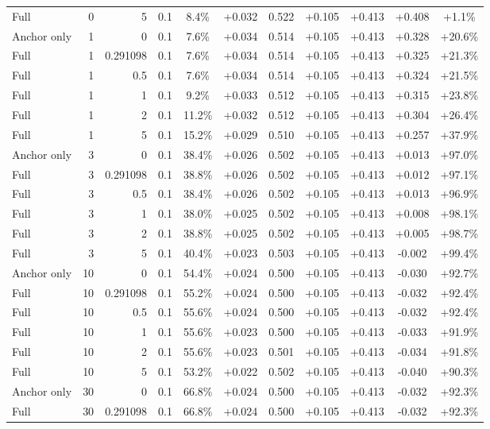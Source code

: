 \begin{table}[htbp]
\begin{tabular}{lrrrccccccc}
Full & 0 & 5 & 0.1 & 8.4\% & +0.032 & 0.522 & +0.105 & +0.413 & +0.408 & +1.1\% \\
Anchor only & 1 & 0 & 0.1 & 7.6\% & +0.034 & 0.514 & +0.105 & +0.413 & +0.328 & +20.6\% \\
Full & 1 & 0.291098 & 0.1 & 7.6\% & +0.034 & 0.514 & +0.105 & +0.413 & +0.325 & +21.3\% \\
Full & 1 & 0.5 & 0.1 & 7.6\% & +0.034 & 0.514 & +0.105 & +0.413 & +0.324 & +21.5\% \\
Full & 1 & 1 & 0.1 & 9.2\% & +0.033 & 0.512 & +0.105 & +0.413 & +0.315 & +23.8\% \\
Full & 1 & 2 & 0.1 & 11.2\% & +0.032 & 0.512 & +0.105 & +0.413 & +0.304 & +26.4\% \\
Full & 1 & 5 & 0.1 & 15.2\% & +0.029 & 0.510 & +0.105 & +0.413 & +0.257 & +37.9\% \\
Anchor only & 3 & 0 & 0.1 & 38.4\% & +0.026 & 0.502 & +0.105 & +0.413 & +0.013 & +97.0\% \\
Full & 3 & 0.291098 & 0.1 & 38.8\% & +0.026 & 0.502 & +0.105 & +0.413 & +0.012 & +97.1\% \\
Full & 3 & 0.5 & 0.1 & 38.4\% & +0.026 & 0.502 & +0.105 & +0.413 & +0.013 & +96.9\% \\
Full & 3 & 1 & 0.1 & 38.0\% & +0.025 & 0.502 & +0.105 & +0.413 & +0.008 & +98.1\% \\
Full & 3 & 2 & 0.1 & 38.8\% & +0.025 & 0.502 & +0.105 & +0.413 & +0.005 & +98.7\% \\
Full & 3 & 5 & 0.1 & 40.4\% & +0.023 & 0.503 & +0.105 & +0.413 & -0.002 & +99.4\% \\
Anchor only & 10 & 0 & 0.1 & 54.4\% & +0.024 & 0.500 & +0.105 & +0.413 & -0.030 & +92.7\% \\
Full & 10 & 0.291098 & 0.1 & 55.2\% & +0.024 & 0.500 & +0.105 & +0.413 & -0.032 & +92.4\% \\
Full & 10 & 0.5 & 0.1 & 55.6\% & +0.024 & 0.500 & +0.105 & +0.413 & -0.032 & +92.4\% \\
Full & 10 & 1 & 0.1 & 55.6\% & +0.023 & 0.500 & +0.105 & +0.413 & -0.033 & +91.9\% \\
Full & 10 & 2 & 0.1 & 55.6\% & +0.023 & 0.501 & +0.105 & +0.413 & -0.034 & +91.8\% \\
Full & 10 & 5 & 0.1 & 53.2\% & +0.022 & 0.502 & +0.105 & +0.413 & -0.040 & +90.3\% \\
Anchor only & 30 & 0 & 0.1 & 66.8\% & +0.024 & 0.500 & +0.105 & +0.413 & -0.032 & +92.3\% \\
Full & 30 & 0.291098 & 0.1 & 66.8\% & +0.024 & 0.500 & +0.105 & +0.413 & -0.032 & +92.3\% \\

\end{tabular}
\end{table}
